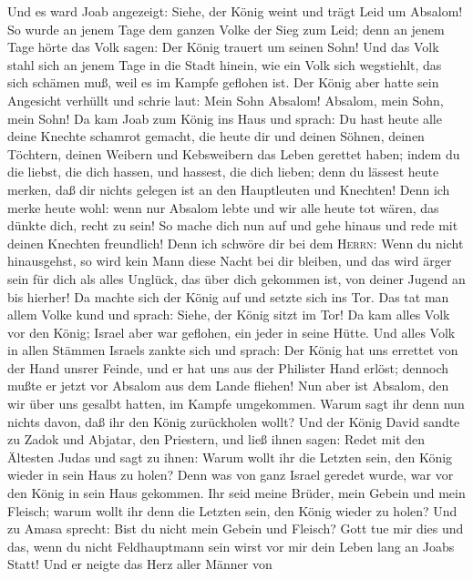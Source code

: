  Und es ward Joab angezeigt: Siehe, der König weint und
trägt Leid um Absalom!  So wurde an jenem Tage dem ganzen
Volke der Sieg zum Leid; denn an jenem Tage hörte das Volk sagen: Der
König trauert um seinen Sohn!  Und das Volk stahl sich an
jenem Tage in die Stadt hinein, wie ein Volk sich wegstiehlt, das sich
schämen muß, weil es im Kampfe geflohen ist.  Der König
aber hatte sein Angesicht verhüllt und schrie laut: Mein Sohn Absalom!
Absalom, mein Sohn, mein Sohn!  Da kam Joab zum König ins
Haus und sprach: Du hast heute alle deine Knechte schamrot gemacht, die
heute dir und deinen Söhnen, deinen Töchtern, deinen Weibern und
Kebsweibern das Leben gerettet haben;  indem du die
liebst, die dich hassen, und hassest, die dich lieben; denn du lässest
heute merken, daß dir nichts gelegen ist an den Hauptleuten und
Knechten! Denn ich merke heute wohl: wenn nur Absalom lebte und wir alle
heute tot wären, das dünkte dich, recht zu sein!  So mache
dich nun auf und gehe hinaus und rede mit deinen Knechten freundlich!
Denn ich schwöre dir bei dem \textsc{Herrn}: Wenn du nicht hinausgehst,
so wird kein Mann diese Nacht bei dir bleiben, und das wird ärger sein
für dich als alles Unglück, das über dich gekommen ist, von deiner
Jugend an bis hierher!  Da machte sich der König auf und
setzte sich ins Tor. Das tat man allem Volke kund und sprach: Siehe, der
König sitzt im Tor! Da kam alles Volk vor den König; Israel aber war
geflohen, ein jeder in seine Hütte.  Und alles Volk in
allen Stämmen Israels zankte sich und sprach: Der König hat uns errettet
von der Hand unsrer Feinde, und er hat uns aus der Philister Hand
erlöst; dennoch mußte er jetzt vor Absalom aus dem Lande fliehen!
 Nun aber ist Absalom, den wir über uns gesalbt hatten,
im Kampfe umgekommen. Warum sagt ihr denn nun nichts davon, daß ihr den
König zurückholen wollt?  Und der König David sandte zu
Zadok und Abjatar, den Priestern, und ließ ihnen sagen: Redet mit den
Ältesten Judas und sagt zu ihnen: Warum wollt ihr die Letzten sein, den
König wieder in sein Haus zu holen? Denn was von ganz Israel geredet
wurde, war vor den König in sein Haus gekommen.  Ihr seid
meine Brüder, mein Gebein und mein Fleisch; warum wollt ihr denn die
Letzten sein, den König wieder zu holen?  Und zu Amasa
sprecht: Bist du nicht mein Gebein und Fleisch? Gott tue mir dies und
das, wenn du nicht Feldhauptmann sein wirst vor mir dein Leben lang an
Joabs Statt!  Und er neigte das Herz aller Männer von
